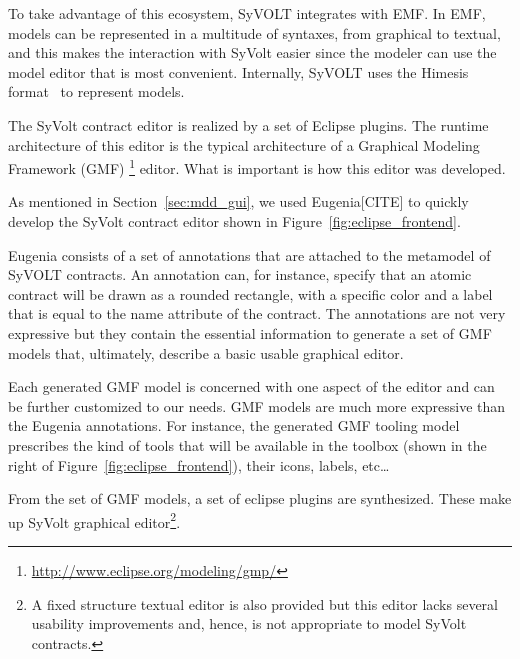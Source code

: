   To take advantage of this ecosystem, SyVOLT integrates with EMF.
  In EMF, models can be represented in a multitude of syntaxes, from graphical
  to textual, and this makes the interaction with SyVolt easier since the modeler
  can use the model editor that is most convenient. Internally, SyVOLT uses 
  the Himesis format~\cite{Provost2006} to represent models.
  
  The SyVolt contract editor is realized by a set of Eclipse plugins.
  The runtime architecture of this editor is the typical architecture of a
  Graphical Modeling Framework (GMF)
  \footnote{\url{http://www.eclipse.org/modeling/gmp/}} editor.
  What is important is how this editor was developed.
  
  As mentioned in Section~\ref{sec:mdd_gui}, we used Eugenia[CITE] to quickly develop the SyVolt contract editor
  shown in Figure~\ref{fig:eclipse_frontend}.
  
   Eugenia consists of a set of annotations that are attached
  to the metamodel of SyVOLT contracts. An annotation can, for instance, specify
  that an atomic contract will be drawn as a rounded rectangle, with a specific
  color and a label that is equal to the name attribute of the contract.
  The annotations are not very expressive but they contain the essential
  information to generate a set of GMF models that, ultimately, describe a basic
  usable graphical editor.
  
  Each generated GMF model is concerned with one aspect of the editor and can be
  further customized to our needs. GMF models are much more expressive than the
  Eugenia annotations.
  For instance, the generated GMF tooling model prescribes the kind of tools that
  will be available in the toolbox (shown in the right of
  Figure~\ref{fig:eclipse_frontend}), their icons, labels, etc\ldots
  
  From the set of GMF models, a set of eclipse plugins are synthesized.
  These make up SyVolt graphical editor\footnote{A fixed structure textual editor
  is also provided but this editor lacks several usability improvements and,
  hence, is not appropriate to model SyVolt contracts.}.
  
